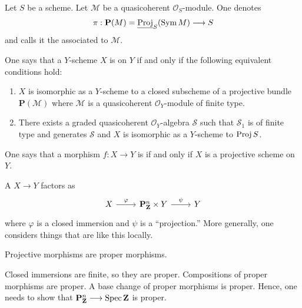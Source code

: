 \documentclass [11 pt, oneside] {article}
\begin{document}
\begin{definition}\label{thatinfamousdef}\text{}
Let $S$ be a scheme. Let $\mathscr{M}$ be a quasicoherent $\mathscr{O}_S$-module. One denotes 
\begin{align*}
	\pi : \mathbf{P}(\relax{M}) = \underline{\operatorname{Proj}}_S(\operatorname{Sym} \relax{M})\longrightarrow S
\end{align*}
and calls it the  associated to $\mathscr{M}$.
\end{definition}


\begin{definition}\label{ega552}\text{}
One says that a $Y$-scheme $X$ is  on $Y$ if and only if the following equivalent conditions hold:
\begin{enumerate}
	\item $X$ is isomorphic as a $Y$-scheme to a closed subscheme of a projective bundle $\mathbf{P}(\mathscr{M})$ where $\mathscr{M}$ is a quasicoherent $\mathscr{O}_Y$-module of finite type.
	\item There exists a graded quasicoherent $\mathscr{O}_Y$-algebra $\mathscr{S}$ such that $\mathscr{S}_1$ is of finite type and generates $\mathscr{S}$ and $X$ is isomorphic as a $Y$-scheme to $\operatorname{Proj} \relax{S}$.
\end{enumerate}

One says that a morphism $f: X\longrightarrow Y$ is  if and only if $X$ is a projective scheme on $Y$.
\end{definition}

\begin{definition}
	A  $X\longrightarrow Y$ factors as 
	\[
	\begin{tikzcd}
		X\ar[r,"\varphi"] & \mathbf{P}^n_{\mathbf{Z}} \times Y \ar[r, "\psi"] & Y
	\end{tikzcd}
	\]
	where $\varphi$ is a closed immersion and $\psi$ is a ``projection.'' More generally, one considers things that are like this locally.
\end{definition}

\begin{proposition}[ ]\label{}\text{}
Projective morphisms are proper morphisms.
\end{proposition}

Closed immersions are finite, so they are proper. Compositions of proper morphisms are proper. A base change of proper morphisms is proper. Hence, one needs to show that $\mathbf{P}^n_{\mathbf{Z}}\longrightarrow \operatorname{Spec} \mathbf{Z}$ is proper. 
\end{document}
